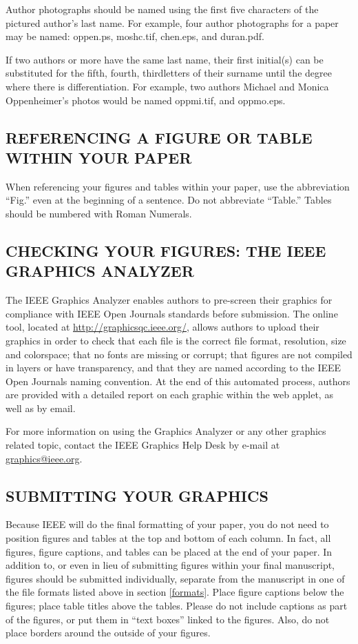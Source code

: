 \documentclass{IEEEoj}
\begin{document}
Author photographs should be named using the first five characters of the 
pictured author's last name. For example, four author photographs for a 
paper may be named: oppen.ps, moshc.tif, chen.eps, and duran.pdf.

If two authors or more have the same last name, their first initial(s) can 
be substituted for the fifth, fourth, third\textellipsis letters of their surname 
until the degree where there is differentiation. For example, two authors 
Michael and Monica Oppenheimer's photos would be named oppmi.tif, and 
oppmo.eps.

\subsection{REFERENCING A FIGURE OR TABLE WITHIN YOUR PAPER}
When referencing your figures and tables within your paper, use the 
abbreviation ``Fig.'' even at the beginning of a sentence. Do not abbreviate 
``Table.'' Tables should be numbered with Roman Numerals.

\subsection{CHECKING YOUR FIGURES: THE IEEE GRAPHICS ANALYZER}
The IEEE Graphics Analyzer enables authors to pre-screen their graphics for 
compliance with IEEE Open Journals standards before submission. The online 
tool, located at \underline {http://graphicsqc.ieee.org/}, allows authors to 
upload their graphics in order to check that each file is the correct file 
format, resolution, size and colorspace; that no fonts are missing or 
corrupt; that figures are not compiled in layers or have transparency, and 
that they are named according to the IEEE Open Journals naming convention. 
At the end of this automated process, authors are provided with a detailed 
report on each graphic within the web applet, as well as by email.

For more information on using the Graphics Analyzer 
or any other graphics related topic, contact the IEEE Graphics Help Desk by 
e-mail at \underline {graphics@ieee.org}.

\subsection{SUBMITTING YOUR GRAPHICS}
Because IEEE will do the final formatting of your paper, 
you do not need to position figures and tables at the top and bottom of each 
column. In fact, all figures, figure captions, and tables can be placed at 
the end of your paper. In addition to, or even in lieu of submitting figures 
within your final manuscript, figures should be submitted individually, 
separate from the manuscript in one of the file formats listed above in 
section \ref{formats}. Place figure captions below the figures; place table titles 
above the tables. Please do not include captions as part of the figures, or 
put them in ``text boxes'' linked to the figures. Also, do not place borders 
around the outside of your figures.
\end{document}
